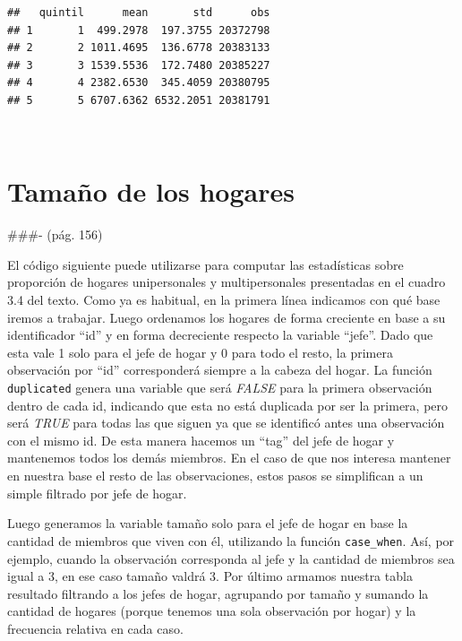 \documentclass[
]{book}
\begin{document}
\begin{verbatim}
##   quintil      mean       std      obs
## 1       1  499.2978  197.3755 20372798
## 2       2 1011.4695  136.6778 20383133
## 3       3 1539.5536  172.7480 20385227
## 4       4 2382.6530  345.4059 20380795
## 5       5 6707.6362 6532.2051 20381791
\end{verbatim}

~

\hypertarget{tamauxf1o-de-los-hogares}{%
\section{Tamaño de los hogares}\label{tamauxf1o-de-los-hogares}}

\#\#\#- (pág. 156)

El código siguiente puede utilizarse para computar las estadísticas sobre proporción de hogares unipersonales y multipersonales presentadas en el cuadro 3.4 del texto. Como ya es habitual, en la primera línea indicamos con qué base iremos a trabajar. Luego ordenamos los hogares de forma creciente en base a su identificador ``id'' y en forma decreciente respecto la variable ``jefe''. Dado que esta vale 1 solo para el jefe de hogar y 0 para todo el resto, la primera observación por ``id'' corresponderá siempre a la cabeza del hogar. La función \texttt{duplicated} genera una variable que será \emph{FALSE} para la primera observación dentro de cada id, indicando que esta no está duplicada por ser la primera, pero será \emph{TRUE} para todas las que siguen ya que se identificó antes una observación con el mismo id. De esta manera hacemos un ``tag'' del jefe de hogar y mantenemos todos los demás miembros. En el caso de que nos interesa mantener en nuestra base el resto de las observaciones, estos pasos se simplifican a un simple filtrado por jefe de hogar.

Luego generamos la variable tamaño solo para el jefe de hogar en base la cantidad de miembros que viven con él, utilizando la función \texttt{case\_when}. Así, por ejemplo, cuando la observación corresponda al jefe y la cantidad de miembros sea igual a 3, en ese caso tamaño valdrá 3. Por último armamos nuestra tabla resultado filtrando a los jefes de hogar, agrupando por tamaño y sumando la cantidad de hogares (porque tenemos una sola observación por hogar) y la frecuencia relativa en cada caso.
\end{document}
